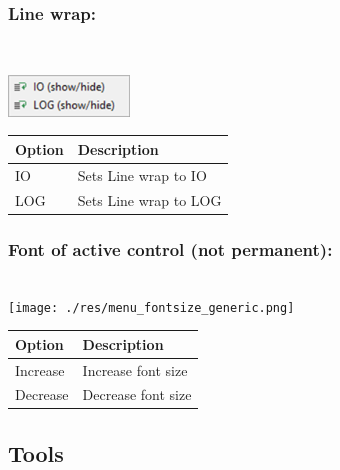 \hypertarget{menu_view_r_term_linewrap}{}
\subsubsection{Line wrap:}\\

\includegraphics[scale=0.8]{./res/menu_r_term_linewrap.png}\\

\begin{scriptsize}
  \begin{tabularx}{\textwidth}{>{\hsize=0.3\hsize}X>{\hsize=0.7\hsize}X}\\
    \hline
    \textbf{Option} & \textbf{Description} \\
    \hline
    IO & Sets Line wrap to IO \\
    LOG & Sets Line wrap to LOG \\
    \hline
  \end{tabularx}
\end{scriptsize}


\hypertarget{menu_r_term_fontsize}{}
\subsubsection{Font of active control (not permanent):}\\

\texttt{[image: ./res/menu\_fontsize\_generic.png]}\\

\begin{scriptsize}
  \begin{tabularx}{\textwidth}{>{\hsize=0.3\hsize}X>{\hsize=0.7\hsize}X}\\
    \hline
    \textbf{Option} & \textbf{Description} \\
    \hline
    Increase & Increase font size \\
    Decrease & Decrease font size \\
    \hline
  \end{tabularx}
\end{scriptsize}


\hypertarget{menu_view_tools}{}
\subsection{Tools}

